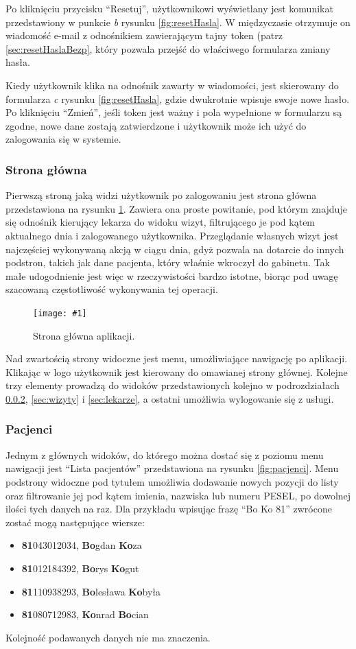 \documentclass[11pt]{aghdpl}
\newcommand{\fullWidthPicture}[2]{
\begin{figure}[h!]
	\centering
		\texttt{[image: \#1]}
	\caption{#2}
	\label{fig:#1}
\end{figure}
}
\begin{document}
Po kliknięciu przycisku ``Resetuj'', użytkownikowi wyświetlany jest komunikat przedstawiony w punkcie \emph{b} rysunku \ref{fig:resetHasla}. W międzyczasie otrzymuje on wiadomość e-mail z odnośnikiem zawierającym tajny token (patrz \ref{sec:resetHaslaBezp}, który pozwala przejść do właściwego formularza zmiany hasła.

Kiedy użytkownik klika na odnośnik zawarty w wiadomości, jest skierowany do formularza \emph{c} rysunku \ref{fig:resetHasla}, gdzie dwukrotnie wpisuje swoje nowe hasło. Po kliknięciu ``Zmień'', jeśli token jest ważny i pola wypełnione w formularzu są zgodne, nowe dane zostają zatwierdzone i użytkownik może ich użyć do zalogowania się w systemie.

\subsubsection{Strona główna}

Pierwszą stroną jaką widzi użytkownik po zalogowaniu jest strona główna przedstawiona na rysunku \ref{fig:home}. Zawiera ona proste powitanie, pod którym znajduje się odnośnik kierujący lekarza do widoku wizyt, filtrującego je pod kątem aktualnego dnia i zalogowanego użytkownika. Przeglądanie własnych wizyt jest najczęściej wykonywaną akcją w ciągu dnia, gdyż pozwala na dotarcie do innych podstron, takich jak dane pacjenta, który właśnie wkroczył do gabinetu. Tak małe udogodnienie jest więc w rzeczywistości bardzo istotne, biorąc pod uwagę szacowaną częstotliwość wykonywania tej operacji.

\fullWidthPicture{home}{Strona główna aplikacji.}

Nad zwartością strony widoczne jest menu, umożliwiające nawigację po aplikacji. Klikając w logo użytkownik jest kierowany do omawianej strony głównej. Kolejne trzy elementy prowadzą do widoków przedstawionych kolejno w podrozdziałach \ref{sec:pacjenci}, \ref{sec:wizyty} i \ref{sec:lekarze}, a ostatni umożliwia wylogowanie się z usługi.

\subsubsection{Pacjenci}
\label{sec:pacjenci}

Jednym z głównych widoków, do którego można dostać się z poziomu menu nawigacji jest ``Lista pacjentów'' przedstawiona na rysunku \ref{fig:pacjenci}. Menu podstrony widoczne pod tytułem umożliwia dodawanie nowych pozycji do listy oraz filtrowanie jej pod kątem imienia, nazwiska lub numeru PESEL, po dowolnej ilości tych danych na raz. Dla przykładu wpisując frazę ``Bo Ko 81'' zwrócone zostać mogą następujące wiersze:
\begin{itemize}
	\item \textbf{81}043012034, \textbf{Bo}gdan \textbf{Ko}za
	\item \textbf{81}012184392, \textbf{Bo}rys \textbf{Ko}gut
	\item \textbf{81}110938293, \textbf{Bo}lesława \textbf{Ko}była
	\item \textbf{81}080712983, \textbf{Ko}nrad \textbf{Bo}cian
\end{itemize}
Kolejność podawanych danych nie ma znaczenia.
\end{document}
